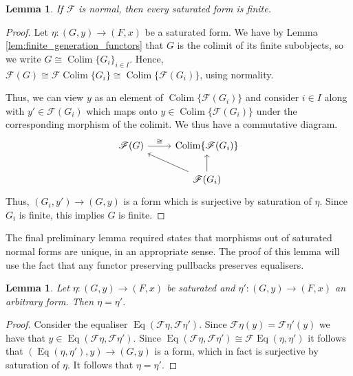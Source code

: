 \documentclass[12pt]{article}
\theoremstyle{plain}
\newtheorem{lemma}[thm]{Lemma}
\theoremstyle{definition}
\newcommand{\scr}[1]{\mathscr{#1}}
\newcommand{\lto}{\longrightarrow}
\begin{document}
	\begin{lemma}
		If $\scr{F}$ is normal, then every saturated form is finite.
		\end{lemma}
	\begin{proof}
		Let $\eta: (G, y) \lto (F,x)$ be a saturated form. We have by Lemma \ref{lem:finite_generation_functors} that $G$ is the colimit of its finite subobjects, so we write $G \cong \operatorname{Colim}\{ G_i \}_{i \in I}$. Hence, $\scr{F}(G) \cong \scr{F} \operatorname{Colim}\{ G_i \} \cong \operatorname{Colim}\{ \scr{F}(G_i) \}$, using normality.
  
		Thus, we can view $y$ as an element of $\operatorname{Colim}\{ \scr{F}(G_i) \}$ and consider $i \in I$ along with $y' \in \scr{F}(G_i)$ which maps onto $y \in \operatorname{Colim}\{ \scr{F}(G_i) \}$ under the corresponding morphism of the colimit. We thus have a commutative diagram.
		\begin{equation}
			\begin{tikzcd}
				\scr{F}(G)\arrow[r,"{\cong}"] & \operatorname{Colim}\{ \scr{F}(G_i) \}\\
				& \scr{F} (G_i)\arrow[u]\arrow[ul]
				\end{tikzcd}
			\end{equation}
		Thus, $(G_i, y') \lto (G,y)$ is a form which is surjective by saturation of $\eta$. Since $G_i$ is finite, this implies $G$ is finite.
		\end{proof}
	The final preliminary lemma required states that morphisms out of saturated normal forms are unique, in an appropriate sense. The proof of this lemma will use the fact that any functor preserving pullbacks preserves equalisers.
	\begin{lemma}\label{lem:saturated_unique}
		Let $\eta: (G,y) \lto (F,x)$ be saturated and $\eta': (G,y) \lto (F,x)$ an arbitrary form. Then $\eta = \eta'$.
		\end{lemma}
	\begin{proof}
		Consider the equaliser $\operatorname{Eq}(\scr{F}\eta, \scr{F}\eta')$. Since $\scr{F}\eta(y) = \scr{F}\eta'(y)$ we have that $y \in \operatorname{Eq}(\scr{F}\eta, \scr{F}\eta')$. Since $\operatorname{Eq}(\scr{F}\eta, \scr{F}\eta') \cong \scr{F}\operatorname{Eq}(\eta,\eta')$ it follows that $(\operatorname{Eq}(\eta,\eta'), y) \lto (G,y)$ is a form, which in fact is surjective by saturation of $\eta$. It follows that $\eta = \eta'$.
		\end{proof}
	
\end{document}
